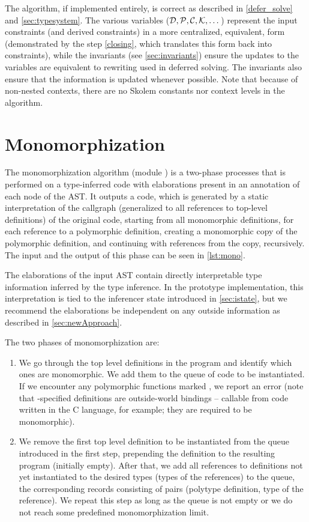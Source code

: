 The algorithm, if implemented entirely, is correct as described in \cref{defer_solve} and \cref{sec:typesystem}. The various variables ($\mathcal D, \mathcal P, \mathcal C, \mathcal K, \dots$) represent the input constraints (and derived constraints) in a more centralized, equivalent, form (demonstrated by the step \ref{closing}, which translates this form back into constraints), while the invariants (see \cref{sec:invariants}) ensure the updates to the variables are equivalent to rewriting used in deferred solving. The invariants also ensure that the information is updated whenever possible. Note that because of non-nested contexts, there are no Skolem constants nor context levels in the algorithm.

\section{Monomorphization}
\label{sec:mono}

The monomorphization algorithm (module ) is a two-phase processes that is performed on a type-inferred code with elaborations present in an annotation of each node of the AST. It outputs a code, which is generated by a static interpretation of the callgraph (generalized to all references to top-level definitions) of the original code, starting from all monomorphic definitions, for each reference to a polymorphic definition, creating a monomorphic copy of the polymorphic definition, and continuing with references from the copy, recursively. The input and the output of this phase can be seen in \cref{lst:mono}.

The elaborations of the input AST contain directly interpretable type information inferred by the type inference. In the prototype implementation, this interpretation is tied to the inferencer state introduced in \cref{sec:istate}, but we recommend the elaborations be independent on any outside information as described in \cref{sec:newApproach}.

The two phases of monomorphization are:

\begin{enumerate}
    \item We go through the top level definitions in the program and identify which ones are monomorphic. We add them to the queue of code to be instantiated. If we encounter any polymorphic functions marked , we report an error (note that -specified definitions are outside-world bindings -- callable from code written in the C language, for example; they are required to be monomorphic).

    \item We remove the first top level definition to be instantiated from the queue introduced in the first step, prepending the definition to the resulting program (initially empty). After that, we add all references to  definitions not yet instantiated to the desired types (types of the references) to the queue, the corresponding records consisting of pairs (polytype definition, type of the reference). We repeat this step as long as the queue is not empty or we do not reach some predefined monomorphization limit. \label{steptwo}
\end{enumerate}

